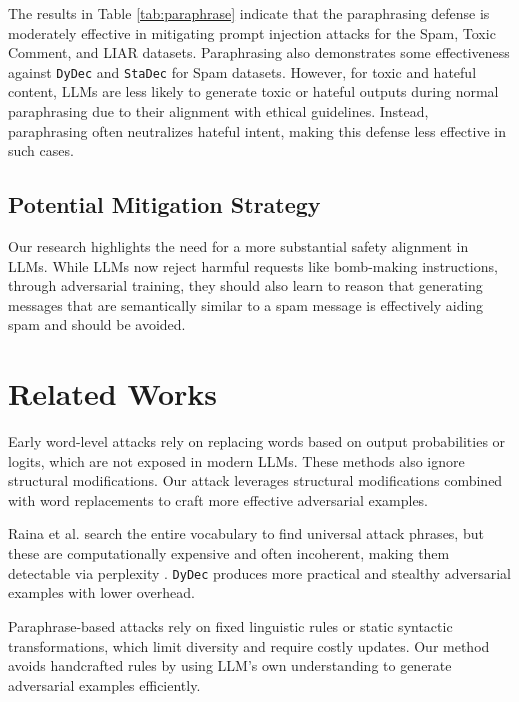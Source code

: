\documentclass[11pt]{article}
\newcommand \dydec[0]{\texttt{DyDec}}
\newcommand \stadec[0]{\texttt{StaDec}}
\begin{document}
The results in Table \ref{tab:paraphrase} indicate that the paraphrasing defense is moderately effective in mitigating prompt injection attacks for the Spam, Toxic Comment, and LIAR datasets. Paraphrasing also demonstrates some effectiveness against \dydec{} and \stadec{} for Spam datasets.  However, for toxic and hateful content, LLMs are less likely to generate toxic or hateful outputs during normal paraphrasing due to their alignment with ethical guidelines. Instead, paraphrasing often neutralizes hateful intent, making this defense less effective in such cases.

\subsection{Potential Mitigation Strategy}
\label{subsec:mitigation}
Our research highlights the need for a more substantial safety alignment in LLMs. While LLMs now reject harmful requests like bomb-making instructions, through adversarial training, they should also learn to reason that generating messages that are semantically similar to a spam message is effectively aiding spam and should be avoided.

\section{Related Works}
Early word-level attacks \cite{Jin_Jin_Zhou_Szolovits_2020, alzantot-etal-2018-generating, garg-ramakrishnan-2020-bae, morris-etal-2020-textattack} rely on replacing words based on output probabilities or logits, which are not exposed in modern LLMs. These methods also ignore structural modifications. Our attack leverages structural modifications combined with word replacements to craft more effective adversarial examples.

Raina et al. \cite{raina-etal-2024-llm} search the entire vocabulary to find universal attack phrases, but these are computationally expensive and often incoherent, making them detectable via perplexity \cite{jain2023baselinedefensesadversarialattacks}. \dydec{} produces more practical and stealthy adversarial examples with lower overhead.

Paraphrase-based attacks \cite{ribeiro-etal-2018-semantically, iyyer-etal-2018-adversarial} rely on fixed linguistic rules or static syntactic transformations, which limit diversity and require costly updates. Our method avoids handcrafted rules by using LLM's own understanding to generate adversarial examples efficiently.
\end{document}
